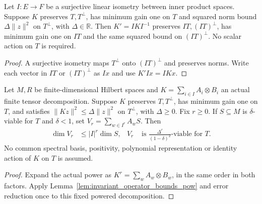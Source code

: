 \begin{lemma}
    \label{lem:invariant_operator_bounds_conj}
    \leanok
    Let $I:E\to F$ be a surjective linear isometry between inner product
    spaces. Suppose $K$ preserves $T,T^\perp$, has minimum gain one on
    $T$ and squared norm bound $\Delta\|z\|^2$ on $T^\perp$, with
    $\Delta\in\mathbb R$. Then $K'=IKI^{-1}$ preserves $IT,(IT)^\perp$,
    has minimum gain one on $IT$ and the same squared bound on $(IT)^\perp$.
    No scalar action on $T$ is required.
\end{lemma}
\begin{proof}\leanok
    A surjective isometry maps $T^\perp$ onto $(IT)^\perp$ and preserves
    norms. Write each vector in $IT$ or $(IT)^\perp$ as $Ix$ and use
    $K'Ix=IKx$.
\end{proof}

\begin{lemma}
    \label{lem:invariant_tensor_word_power}
    \leanok
    Let $M,R$ be finite-dimensional Hilbert spaces and
    $K=\sum_{i\in I}A_i\otimes B_i$ an actual finite tensor decomposition.
    Suppose $K$ preserves $T,T^\perp$, has minimum gain one on $T$, and
    satisfies $\|Kz\|^2\le\Delta\|z\|^2$ on $T^\perp$, with $\Delta\ge0$.
    Fix $r\ge0$. If $S\subseteq M$ is $\delta$-viable for $T$ and
    $\delta<1$, set $V_r=\sum_{w\in I^r}A_wS$. Then
    \begin{align}
        \dim V_r&\le |I|^r\dim S,&
        V_r&\text{ is }\frac{\Delta^r}{(1-\delta)^2}\text{-viable for }T.
    \end{align}
    No common spectral basis, positivity, polynomial representation or
    identity action of $K$ on $T$ is assumed.
\end{lemma}
\begin{proof}\leanok
    Expand the actual power as $K^r=\sum_w A_w\otimes B_w$, in the same
    order in both factors. Apply Lemma~\ref{lem:invariant_operator_bounds_pow}
    and error reduction once to this fixed powered decomposition.
\end{proof}
